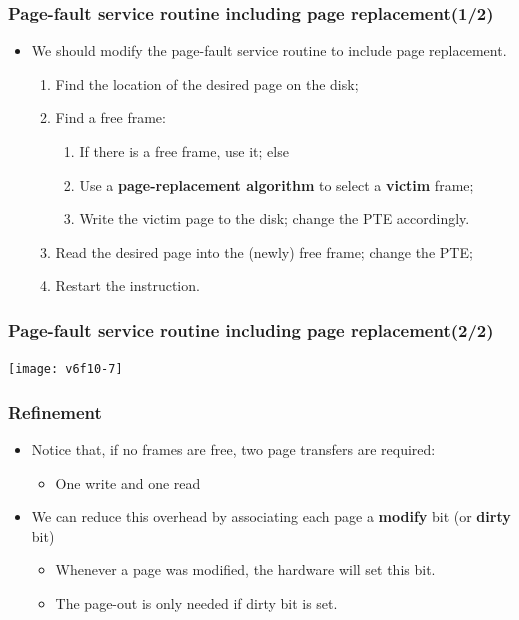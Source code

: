 \documentclass[CJKutf8,dvipsnames,table]{beamer}
\begin{document}
\begin{CJK*}{UTF8}{song}
  \begin{frame}
    \frametitle{Page-fault service routine including page replacement(1/2)} \pause
    \begin{itemize}
    \item{We should modify the page-fault service routine to include page replacement.} \pause
      \begin{enumerate}
      \item{Find the location of the desired page on the disk;} \pause
      \item{Find a free frame: } \pause
        \begin{enumerate}
        \item{If there is a free frame, use it; else} \pause
        \item{Use a \textbf{page-replacement algorithm} to select a \textbf{victim} frame;} \pause
        \item{Write the victim page to the disk; change the PTE accordingly.} \pause
        \end{enumerate}
      \item{Read the desired page into the (newly) free frame; change the PTE;} \pause
      \item{Restart the instruction.}
      \end{enumerate}
    \end{itemize}
  \end{frame}
  
  \begin{frame}
    \frametitle{Page-fault service routine including page replacement(2/2)} \pause
    \begin{center}
      \texttt{[image: v6f10-7]}
    \end{center}
  \end{frame}
  
  \begin{frame}
    \frametitle{Refinement} \pause
    \begin{itemize}
    \item{Notice that, if no frames are free, two page transfers are required: } \pause
      \begin{itemize}
      \item{One write and one read} \pause
      \end{itemize}
    \item{We can reduce this overhead by associating each page a \textbf{modify} bit (or \textbf{dirty} bit)} \pause
      \begin{itemize}
      \item{Whenever a page was modified, the hardware will set this bit.} \pause
      \item{The page-out is only needed if dirty bit is set.}
      \end{itemize}
    \end{itemize}
  \end{frame}
  

\end{CJK*}
\end{document}
